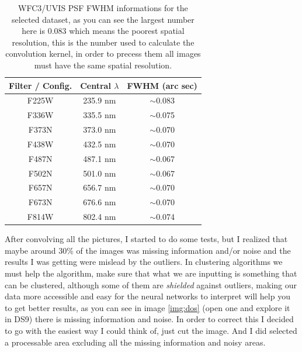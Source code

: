 \documentclass[11pt,fleqn]{book} %
\begin{document}
\begin{table}[h]
  \centering
    \begin{tabular}{ c c c }
    \hline\hline
    
    Filter / Config. & Central $\lambda$ & FWHM (arc sec)\\
    \hline
    
    F225W & 235.9 nm & $\sim$0.083\\
    
    F336W & 335.5 nm & $\sim$0.075\\
    
    F373N & 373.0 nm & $\sim$0.070\\
    
    F438W & 432.5 nm & $\sim$0.070\\
    
    F487N & 487.1 nm & $\sim$0.067\\
    
    F502N & 501.0 nm & $\sim$0.067\\
    
    F657N & 656.7 nm & $\sim$0.070\\
    
    F673N & 676.6 nm & $\sim$0.070\\
    
    F814W & 802.4 nm & $\sim$0.074\\
    
    \hline
  \end{tabular}
  \caption{WFC3/UVIS PSF FWHM informations for the selected dataset, as you can see the largest number here is 0.083 which means the poorest spatial resolution, this is the number used to calculate the convolution kernel, in order to precess them all images must have the same spatial resolution.}
  \label{tab:dos}
\end{table}

After convolving all the pictures, I started to do some tests, but I realized that maybe around 30\% of the images was missing information and/or noise and the results I was getting were mislead by the outliers. In clustering algorithms we must help the algorithm, make sure that what we are inputting is something that can be clustered, although some of them are \emph{shielded} against outliers, making our data more accessible and easy for the neural networks to interpret will help you to get better results, as you can see in image \ref{img:dos} (open one and explore it in DS9) there is missing information and noise. In order to correct this I decided to go with the easiest way I could think of, just cut the image. And I did selected a processable area excluding all the missing information and noisy areas.
\end{document}

